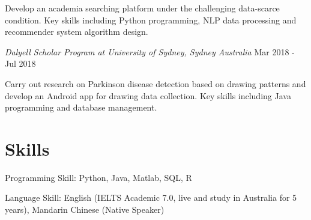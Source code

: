\documentclass[letterpaper,11pt]{article}
\begin{document}
Develop an academia searching platform under the challenging data-scarce condition. Key skills including Python programming, NLP data processing and recommender system algorithm design. 

\vspace{9pt}

\textit{Dalyell Scholar Program at University of Sydney, Sydney Australia} \hfill Mar 2018 - Jul 2018

Carry out research on Parkinson disease detection based on drawing patterns and develop an Android app for drawing data collection. Key skills including Java programming and database management. 

\vspace{1pt}

\section{Skills}
Programming Skill: Python, Java, Matlab, SQL, R

Language Skill: English (IELTS Academic 7.0, live and study in Australia for 5 years), Mandarin Chinese (Native Speaker)
\end{document}
